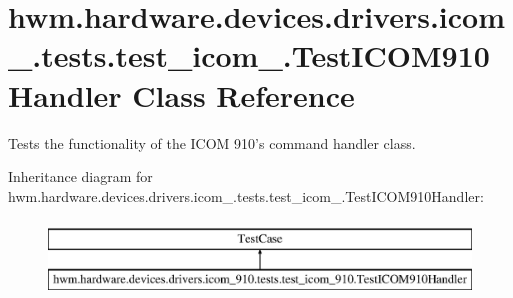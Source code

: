 \hypertarget{classhwm_1_1hardware_1_1devices_1_1drivers_1_1icom__910_1_1tests_1_1test__icom__910_1_1_test_i_c_o_m910_handler}{\section{hwm.\-hardware.\-devices.\-drivers.\-icom\-\_.\-tests.\-test\-\_\-icom\-\_.\-Test\-I\-C\-O\-M910\-Handler Class Reference}
\label{classhwm_1_1hardware_1_1devices_1_1drivers_1_1icom__910_1_1tests_1_1test__icom__910_1_1_test_i_c_o_m910_handler}
}


Tests the functionality of the I\-C\-O\-M 910's command handler class.  


Inheritance diagram for hwm.\-hardware.\-devices.\-drivers.\-icom\-\_.\-tests.\-test\-\_\-icom\-\_.\-Test\-I\-C\-O\-M910\-Handler\-:\begin{figure}[H]
\begin{center}
\leavevmode
\includegraphics[height=2.000000cm]{classhwm_1_1hardware_1_1devices_1_1drivers_1_1icom__910_1_1tests_1_1test__icom__910_1_1_test_i_c_o_m910_handler}
\end{center}
\end{figure}
